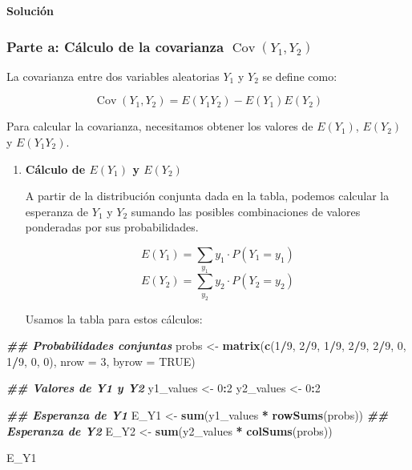 \documentclass[
]{article}
\newenvironment{Shaded}{\begin{snugshade}}{\end{snugshade}}
\newcommand{\AttributeTok}[1]{\textcolor[rgb]{0.13,0.29,0.53}{#1}}
\newcommand{\ConstantTok}[1]{\textcolor[rgb]{0.56,0.35,0.01}{#1}}
\newcommand{\DecValTok}[1]{\textcolor[rgb]{0.00,0.00,0.81}{#1}}
\newcommand{\DocumentationTok}[1]{\textcolor[rgb]{0.56,0.35,0.01}{\textbf{\textit{#1}}}}
\newcommand{\FunctionTok}[1]{\textcolor[rgb]{0.13,0.29,0.53}{\textbf{#1}}}
\newcommand{\NormalTok}[1]{#1}
\newcommand{\OtherTok}[1]{\textcolor[rgb]{0.56,0.35,0.01}{#1}}
\newcommand{\SpecialCharTok}[1]{\textcolor[rgb]{0.81,0.36,0.00}{\textbf{#1}}}
\begin{document}
\textbf{Solución}

\subsubsection{\texorpdfstring{Parte a: Cálculo de la covarianza \(\operatorname{Cov}(Y_1, Y_2)\)}{Parte a: Cálculo de la covarianza \textbackslash operatorname\{Cov\}(Y\_1, Y\_2)}}\label{parte-a-cuxe1lculo-de-la-covarianza-operatornamecovy_1-y_2}

La covarianza entre dos variables aleatorias \(Y_1\) y \(Y_2\) se define como:

\[
\operatorname{Cov}(Y_1, Y_2) = E(Y_1 Y_2) - E(Y_1)E(Y_2)
\]

Para calcular la covarianza, necesitamos obtener los valores de \(E(Y_1)\), \(E(Y_2)\) y \(E(Y_1 Y_2)\).

\begin{enumerate}
\def\labelenumi{\arabic{enumi}.}
\item
  \textbf{Cálculo de \(E(Y_1)\) y \(E(Y_2)\)}

  A partir de la distribución conjunta dada en la tabla, podemos calcular la esperanza de \(Y_1\) y \(Y_2\) sumando las posibles combinaciones de valores ponderadas por sus probabilidades.

  \[ E(Y_1) = \sum_{y_1} y_1 \cdot P(Y_1 = y_1) \]
  \[ E(Y_2) = \sum_{y_2} y_2 \cdot P(Y_2 = y_2) \]

  Usamos la tabla para estos cálculos:
\end{enumerate}

\begin{Shaded}
\begin{Highlighting}[]
   \DocumentationTok{\#\# Probabilidades conjuntas}
\NormalTok{   probs }\OtherTok{\textless{}{-}} \FunctionTok{matrix}\NormalTok{(}\FunctionTok{c}\NormalTok{(}\DecValTok{1}\SpecialCharTok{/}\DecValTok{9}\NormalTok{, }\DecValTok{2}\SpecialCharTok{/}\DecValTok{9}\NormalTok{, }\DecValTok{1}\SpecialCharTok{/}\DecValTok{9}\NormalTok{, }\DecValTok{2}\SpecialCharTok{/}\DecValTok{9}\NormalTok{, }\DecValTok{2}\SpecialCharTok{/}\DecValTok{9}\NormalTok{, }\DecValTok{0}\NormalTok{, }\DecValTok{1}\SpecialCharTok{/}\DecValTok{9}\NormalTok{, }\DecValTok{0}\NormalTok{, }\DecValTok{0}\NormalTok{), }\AttributeTok{nrow =} \DecValTok{3}\NormalTok{, }\AttributeTok{byrow =} \ConstantTok{TRUE}\NormalTok{)}
   
   \DocumentationTok{\#\# Valores de Y1 y Y2}
\NormalTok{   y1\_values }\OtherTok{\textless{}{-}} \DecValTok{0}\SpecialCharTok{:}\DecValTok{2}
\NormalTok{   y2\_values }\OtherTok{\textless{}{-}} \DecValTok{0}\SpecialCharTok{:}\DecValTok{2}
   
   \DocumentationTok{\#\# Esperanza de Y1}
\NormalTok{   E\_Y1 }\OtherTok{\textless{}{-}} \FunctionTok{sum}\NormalTok{(y1\_values }\SpecialCharTok{*} \FunctionTok{rowSums}\NormalTok{(probs))}
   \DocumentationTok{\#\# Esperanza de Y2}
\NormalTok{   E\_Y2 }\OtherTok{\textless{}{-}} \FunctionTok{sum}\NormalTok{(y2\_values }\SpecialCharTok{*} \FunctionTok{colSums}\NormalTok{(probs))}
   
\NormalTok{   E\_Y1}
\end{Highlighting}
\end{Shaded}
\end{document}
